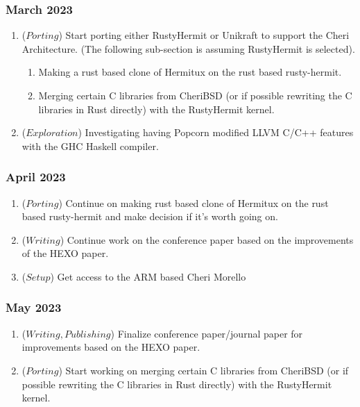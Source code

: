   \subsubsection{March 2023}
  \begin{enumerate}
    \item (\(Porting\)) Start porting either RustyHermit or Unikraft to support the Cheri Architecture. (The following sub-section is assuming 
          RustyHermit is selected).
          \begin{enumerate}
            \item Making a rust based clone of Hermitux on the rust based rusty-hermit. 
            \item Merging certain C libraries from CheriBSD (or if possible rewriting the C libraries in Rust directly) 
            with the RustyHermit kernel. 
          \end{enumerate}
    \item (\(Exploration\)) Investigating having Popcorn modified LLVM C/C++ features with the GHC Haskell compiler. 
  \end{enumerate}

  \subsubsection{April 2023}
  \begin{enumerate}
    \item (\(Porting\)) Continue on making rust based clone of Hermitux on the rust based rusty-hermit and make decision if it's worth going on.
    \item (\(Writing\)) Continue work on the conference paper based on the improvements of the HEXO paper.
    \item (\(Setup\)) Get access to the ARM based Cheri Morello
  \end{enumerate}

  \subsubsection{May 2023}
  \begin{enumerate}
     \item (\(Writing, Publishing\)) Finalize conference paper/journal paper for improvements based on the HEXO paper.
     \item (\(Porting\)) Start working on merging certain C libraries from CheriBSD (or if possible rewriting the C libraries in Rust directly) 
     with the RustyHermit kernel.
  \end{enumerate}

